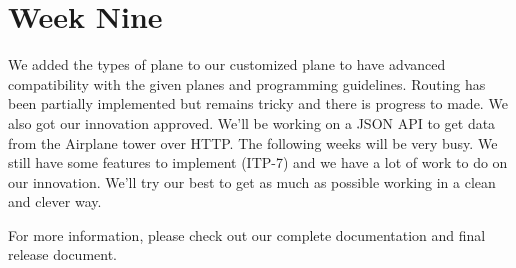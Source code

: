 \documentclass{article}
\begin{document}
\section{Week Nine}

We added the types of plane to our customized plane to have advanced compatibility with the given planes and programming guidelines. Routing has been partially implemented but remains tricky and there is progress to made. We also got our innovation approved. We'll be working on a JSON API to get data from the Airplane tower over HTTP. The following weeks will be very busy. We still have some features to implement (ITP-7) and we have a lot of work to do on our innovation. We'll try our best to get as much as possible working in a clean and clever way.

For more information, please check out our complete documentation and final release document.
\end{document}
